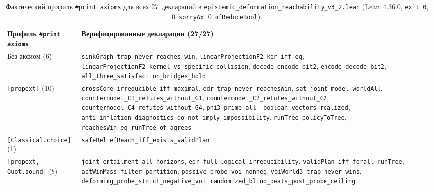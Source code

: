\documentclass[10pt,a4paper]{article}
\theoremstyle{cleanthm}
\theoremstyle{cleandef}
\begin{document}
\begin{table}[!htbp]
\centering
\caption{Фактический профиль \texttt{\#print axioms} для всех 27~деклараций в \texttt{epistemic\_\allowbreak deformation\_\allowbreak reachability\_\allowbreak v3\_\allowbreak 2.lean} (Lean~4.36.0, \texttt{exit 0}, 0~\texttt{sorryAx}, 0~\texttt{ofReduceBool}).}
\label{tab:axioms_v32}
\footnotesize
\begin{tabularx}{\linewidth}{@{}>{\raggedright\arraybackslash}p{45mm} >{\raggedright\arraybackslash}X@{}}
\toprule
\textbf{Профиль \texttt{\#print axioms}} & \textbf{Верифицированные декларации (27/27)} \\
\midrule
Без аксиом (6) & \texttt{sinkGraph\_\allowbreak trap\_\allowbreak never\_\allowbreak reaches\_\allowbreak win}, \texttt{linearProjectionF2\_\allowbreak ker\_\allowbreak iff\_\allowbreak eq}, \texttt{linearProjectionF2\_\allowbreak kernel\_\allowbreak vs\_\allowbreak specific\_\allowbreak collision}, \texttt{decode\_\allowbreak encode\_\allowbreak bit2}, \texttt{encode\_\allowbreak decode\_\allowbreak bit2}, \texttt{all\_\allowbreak three\_\allowbreak satisfaction\_\allowbreak bridges\_\allowbreak hold} \\
\texttt{[propext]} (10) & \texttt{crossCore\_\allowbreak irreducible\_\allowbreak iff\_\allowbreak maximal}, \texttt{edr\_\allowbreak trap\_\allowbreak never\_\allowbreak reachesWin}, \texttt{sat\_\allowbreak joint\_\allowbreak model\_\allowbreak worldAll}, \texttt{countermodel\_\allowbreak C1\_\allowbreak refutes\_\allowbreak without\_\allowbreak G1}, \texttt{countermodel\_\allowbreak C2\_\allowbreak refutes\_\allowbreak without\_\allowbreak G2}, \texttt{countermodel\_\allowbreak C4\_\allowbreak refutes\_\allowbreak without\_\allowbreak G4}, \texttt{phi3\_\allowbreak prime\_\allowbreak all\_\allowbreak 8\_\allowbreak boolean\_\allowbreak vectors\_\allowbreak realized}, \texttt{anti\_\allowbreak inflation\_\allowbreak diagnostics\_\allowbreak do\_\allowbreak not\_\allowbreak imply\_\allowbreak impossibility}, \texttt{runTree\_\allowbreak policyToTree}, \texttt{reachesWin\_\allowbreak eq\_\allowbreak runTree\_\allowbreak of\_\allowbreak agrees} \\
\texttt{[Classical.choice]} (1) & \texttt{safeBeliefReach\_\allowbreak iff\_\allowbreak exists\_\allowbreak validPlan} \\
\texttt{[propext, Quot.sound]} (8) & \texttt{joint\_\allowbreak entailment\_\allowbreak all\_\allowbreak horizons}, \texttt{edr\_\allowbreak full\_\allowbreak logical\_\allowbreak irreducibility}, \texttt{validPlan\_\allowbreak iff\_\allowbreak forall\_\allowbreak runTree}, \texttt{actWinMass\_\allowbreak filter\_\allowbreak partition}, \texttt{passive\_\allowbreak probe\_\allowbreak voi\_\allowbreak nonneg}, \texttt{voiWorld3\_\allowbreak trap\_\allowbreak never\_\allowbreak wins}, \texttt{deforming\_\allowbreak probe\_\allowbreak strict\_\allowbreak negative\_\allowbreak voi}, \texttt{randomized\_\allowbreak blind\_\allowbreak beats\_\allowbreak post\_\allowbreak probe\_\allowbreak ceiling} \\

\end{tabularx}
\end{table}
\end{document}
